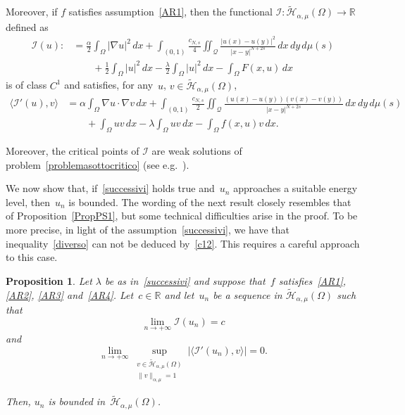 \documentclass[12pt,a4paper,intlimits,sumlimits]{amsart}
\def \R {\mathbb{R}}
\def \Q {\mathcal Q}
\theoremstyle{definition}
\theoremstyle{plain}
\newtheorem{proposition}[definition]{Proposition}
\numberwithin{equation}{section}
\begin{document}
Moreover, if $f$ satisfies assumption~\eqref{AR1}, then the functional $\mathcal I:\widetilde{\mathcal{H}}_{\alpha, \mu}(\Omega)\to\R$ defined as
\begin{equation}\label{funlink}
\begin{split}
\mathcal I(u):&= \frac{\alpha}{2}\int_\Omega |\nabla u|^2 \,dx +\int_{(0, 1)} \frac{c_{N, s}}{4} \iint_{\Q} \frac{|u(x)-u(y)|^2}{|x-y|^{N+2s}} \,dx\,dy\, d\mu(s)\\
&\qquad+\frac12 \int_{\Omega} |u|^2 \, dx -\frac{\lambda}{2} \int_{\Omega} |u|^2 \, dx - \int_\Omega F(x, u) \, dx
\end{split}
\end{equation}
is of class $C^1$ and satisfies, for any~$u$, $v\in \widetilde{\mathcal{H}}_{\alpha, \mu}(\Omega)$,
\begin{equation}\label{diff2}
\begin{split}
\langle \mathcal I'(u), v\rangle &=\alpha \int_\Omega \nabla u\cdot\nabla v\, dx +\int_{(0, 1)} \frac{c_{N, s}}{2} \iint_{\Q} \frac{(u(x)-u(y))(v(x)-v(y))}{|x-y|^{N+2s}} \,dx\,dy\, d\mu(s)\\
&\qquad+\int_\Omega uv\, dx - \lambda\int_\Omega uv\, dx -\int_\Omega f(x, u) v \, dx.
\end{split}
\end{equation}

Moreover, the critical points of $\mathcal I$ are weak solutions of problem~\eqref{problemasottocritico} (see e.g.~\cite[Proposition~4.2]{TUTTI}).

We now show that, if~\eqref{successivi} holds true and~$u_n$ approaches a suitable energy level, then~$u_n$ is bounded.  The wording of the next result closely resembles that of Proposition~\ref{PropPS1},  but some technical difficulties arise in the proof. To be more precise, in light of the assumption~\eqref{successivi},  we have that inequality~\eqref{diverso} can not be deduced by~\eqref{c12}.
This requires a careful approach to this case.

\begin{proposition}\label{boundedlinking}
Let $\lambda$ be as in~\eqref{successivi} and suppose that~$f$ satisfies~\eqref{AR1}, \eqref{AR2}, \eqref{AR3} and~\eqref{AR4}. Let~$c\in\R$ and let~$u_n$ be a sequence in $\widetilde{\mathcal{H}}_{\alpha, \mu}(\Omega)$ such that
\begin{equation}\label{bdd12}
\lim_{n\to +\infty} \mathcal I(u_n)=c
\end{equation}
and
\begin{equation}\label{bdd22}
\lim_{n\to +\infty} \sup_{\substack{v\in \widetilde{\mathcal{H}}_{\alpha, \mu}(\Omega)\\ \|v\|_{\alpha, \mu}=1}} |\langle \mathcal I'(u_n), v\rangle| =0.
\end{equation}

Then, $u_n$ is bounded in~$\widetilde{\mathcal{H}}_{\alpha, \mu}(\Omega)$.
\end{proposition}
\end{document}
